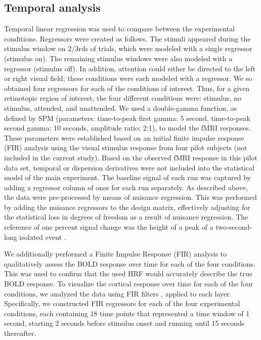 \documentclass[9pt,lineno]{aperture}
\begin{document}
\subsection{Temporal analysis}
Temporal linear regression was used to compare between the experimental conditions. Regressors were created as follows. The stimuli appeared during the stimulus window on 2/3rds of trials, which were modeled with a single regressor (stimulus on). The remaining stimulus windows were also modeled with a regressor (stimulus off). In addition, attention could either be directed to the left or right visual field; these conditions were each modeled with a regressor. We so obtained four regressors for each of the conditions of interest. Thus, for a given retinotopic region of interest, the four different conditions were: stimulus, no stimulus, attended, and unattended. We used a double-gamma function, as defined by SPM (parameters: time-to-peak first gamma: 5 second, time-to-peak second gamma: 10 seconds, amplitude ratio: 2:1), to model the fMRI responses. These parameters were established based on an initial finite impulse response (FIR) analysis \citep{Friston1998} using the visual stimulus response from four pilot subjects (not included in the current study). Based on the observed fMRI response in this pilot data set, temporal or dispersion derivatives were not included into the statistical model of the main experiment. The baseline signal of each run was captured by adding a regressor column of ones for each run separately. As described above, the data were pre-processed by means of nuisance regression. This was performed by adding the nuisance regressors to the design matrix, effectively adjusting for the statistical loss in degrees of freedom as a result of nuisance regression. The reference of one percent signal change was the height of a peak of a two-second-long isolated event \cite{Mumford2007}.

We additionally performed a Finite Impulse Response (FIR) analysis to qualitatively assess the BOLD response over time for each of the four conditions. This was used to confirm that the used HRF would accurately describe the true BOLD response. To visualize the cortical response over time for each of the four conditions, we analyzed the data using FIR filters \citep{Friston1998}, applied to each layer. Specifically, we constructed FIR regressors for each of the four experimental conditions, each containing 18 time points that represented a time window of 1 second, starting 2 seconds before stimulus onset and running until 15 seconds thereafter. 
\end{document}
